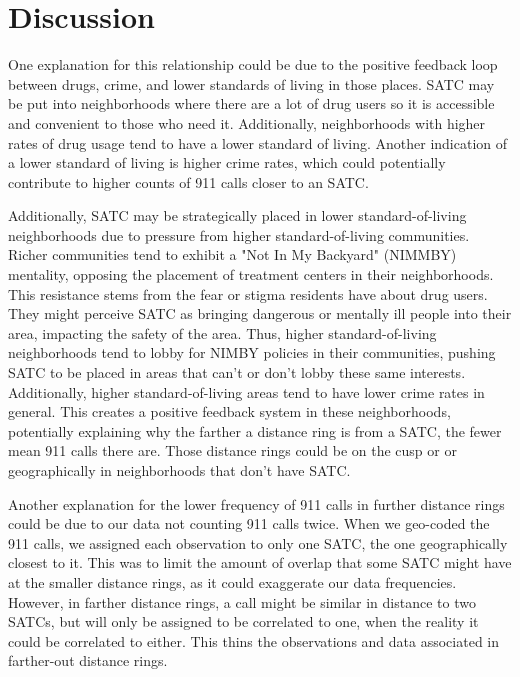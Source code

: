 \documentclass[12pt]{article}
\begin{document}


\section{Discussion}
\label{sec:discussion}

One explanation for this relationship could be due to the positive feedback loop between drugs, crime, and lower standards of living in those places. SATC may be put into neighborhoods where there are a lot of drug users so it is accessible and convenient to those who need it. Additionally, neighborhoods with higher rates of drug usage tend to have a lower standard of living. Another indication of a lower standard of living is higher crime rates, which could potentially contribute to higher counts of 911 calls closer to an SATC. 

Additionally, SATC may be strategically placed in lower standard-of-living neighborhoods due to pressure from higher standard-of-living communities. Richer communities tend to exhibit a "Not In My Backyard" (NIMMBY) mentality, opposing the placement of treatment centers in their neighborhoods. This resistance stems from the fear or stigma residents have about drug users. They might perceive SATC as bringing dangerous or mentally ill people into their area, impacting the safety of the area. Thus, higher standard-of-living neighborhoods tend to lobby for NIMBY policies in their communities, pushing SATC to be placed in areas that can't or don't lobby these same interests. Additionally, higher standard-of-living areas tend to have lower crime rates in general. This creates a positive feedback system in these neighborhoods, potentially explaining why the farther a distance ring is from a SATC, the fewer mean 911 calls there are. Those distance rings could be on the cusp or or geographically in neighborhoods that don't have SATC. 
    
Another explanation for the lower frequency of 911 calls in further distance rings could be due to our data not counting 911 calls twice. When we geo-coded the 911 calls, we assigned each observation to only one SATC, the one geographically closest to it. This was to limit the amount of overlap that some SATC might have at the smaller distance rings, as it could exaggerate our data frequencies. However, in farther distance rings, a call might be similar in distance to two SATCs, but will only be assigned to be correlated to one, when the reality it could be correlated to either. This thins the observations and data associated in farther-out distance rings. 
\end{document}
